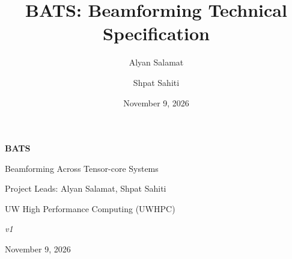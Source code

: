 \documentclass[11pt,letterpaper]{article}
\title{BATS: Beamforming Technical Specification}
\author{Alyan Salamat \and Shpat Sahiti}
\date{November 9, 2026}
\begin{document}
\hypersetup{pageanchor=false}
\begin{titlepage}
  \centering
  \vspace*{3cm}

  {\Huge\bfseries BATS\par}
  \vspace{1cm}
  {\Large Beamforming Across Tensor-core Systems\par}

  \vspace{3cm}
  {\large Project Leads: Alyan Salamat, Shpat Sahiti\par}
  \vspace{0.5cm}
  {\large UW High Performance Computing (UWHPC)\par}

  \vfill

  {\large\itshape v1\par}
  \vspace{0.5cm}
  {\large November 9, 2026\par}

\end{titlepage}
\hypersetup{pageanchor=true}

\tableofcontents
\newpage
{}







\printbibliography
\end{document}
